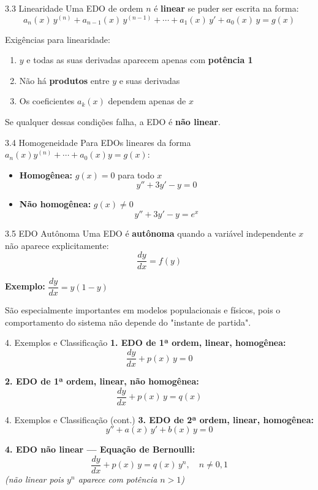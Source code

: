\documentclass[11pt, aspectratio=169]{beamer}
\begin{document}
\begin{frame}{3.3 Linearidade}
Uma EDO de ordem $n$ é \textbf{linear} se puder ser escrita na forma:
\[
a_n(x)\,y^{(n)} + a_{n-1}(x)\,y^{(n-1)} + \cdots + a_1(x)\,y' + a_0(x)\,y = g(x)
\]

Exigências para linearidade:
\begin{enumerate}
  \item $y$ e todas as suas derivadas aparecem apenas com \textbf{potência 1}
  \item Não há \textbf{produtos} entre $y$ e suas derivadas
  \item Os coeficientes $a_k(x)$ dependem apenas de $x$
\end{enumerate}

Se qualquer dessas condições falha, a EDO é \textbf{não linear}.
\end{frame}

\begin{frame}{3.4 Homogeneidade}
Para EDOs lineares da forma $a_n(x)y^{(n)} + \cdots + a_0(x)y = g(x)$:

\begin{itemize}
  \item \textbf{Homogênea:} $g(x) = 0$ para todo $x$
  \[
    y'' + 3y' - y = 0
  \]
  \item \textbf{Não homogênea:} $g(x) \neq 0$
  \[
    y'' + 3y' - y = e^x
  \]
\end{itemize}
\end{frame}

\begin{frame}{3.5 EDO Autônoma}
Uma EDO é \textbf{autônoma} quando a variável independente $x$ não aparece explicitamente:
\[
\frac{dy}{dx} = f(y)
\]

\textbf{Exemplo:} $\dfrac{dy}{dx} = y(1 - y)$

São especialmente importantes em modelos populacionais e físicos, pois o comportamento do sistema não depende do "instante de partida".
\end{frame}

\begin{frame}{4. Exemplos e Classificação}
\textbf{1. EDO de 1ª ordem, linear, homogênea:}
\[
\frac{dy}{dx} + p(x)\,y = 0
\]

\textbf{2. EDO de 1ª ordem, linear, não homogênea:}
\[
\frac{dy}{dx} + p(x)\,y = q(x)
\]
\end{frame}

\begin{frame}{4. Exemplos e Classificação (cont.)}
\textbf{3. EDO de 2ª ordem, linear, homogênea:}
\[
y'' + a(x)\,y' + b(x)\,y = 0
\]

\textbf{4. EDO não linear --- Equação de Bernoulli:}
\[
\frac{dy}{dx} + p(x)\,y = q(x)\,y^n, \quad n \neq 0, 1
\]
\textit{(não linear pois $y^n$ aparece com potência $n > 1$)}
\end{frame}
\end{document}
